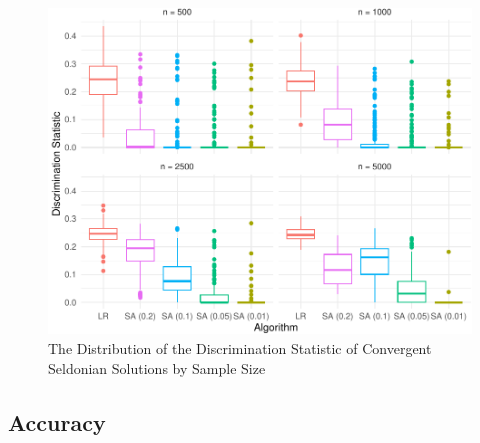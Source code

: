 \documentclass[12pt, twoside]{amherstthesis}
\begin{document}
\begin{figure}

{\centering \includegraphics{Dasha-Asienga_StatThesis_files/figure-latex/ch4fig2-1} 

}

\caption{The Distribution of the Discrimination Statistic of Convergent Seldonian Solutions by Sample Size}\label{fig:ch4fig2}
\end{figure}
\hypertarget{accuracy}{%
\subsection{Accuracy}\label{accuracy}}
\end{document}
